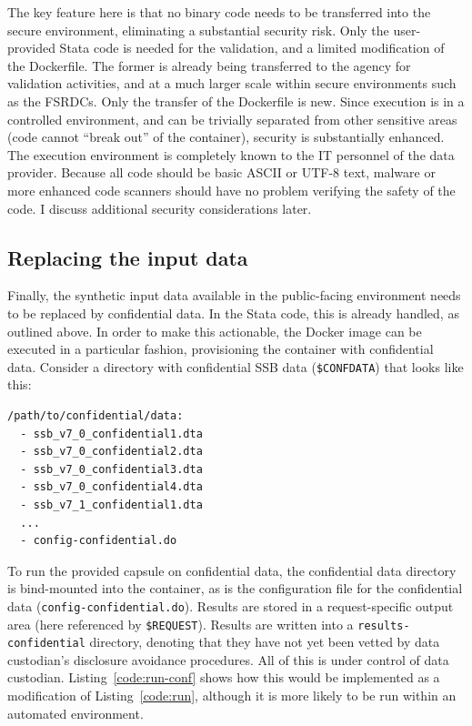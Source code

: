 \documentclass[inline]{hdsr}
\begin{document}
The key feature here is that no binary code needs to be transferred into the secure environment, eliminating a substantial security risk. Only the user-provided Stata code is needed for the validation, and a limited modification of the Dockerfile. The former is already being transferred to the agency for validation activities, and at a much larger scale within secure environments such as the \acp{FSRDC}. Only the transfer of the Dockerfile is new. Since execution is in a controlled environment, and can be trivially separated from other sensitive areas (code cannot ``break out'' of the container), security is substantially enhanced. The execution environment is completely known to the IT personnel of the data provider. Because all code should be basic ASCII or UTF-8 text, malware or more enhanced code scanners should have no problem verifying the safety of the code. I discuss additional security considerations later.

\subsection{Replacing the input data}

Finally, the synthetic input data available in the public-facing environment needs to be replaced by confidential data. In the Stata code, this is already handled, as outlined above. In order to make this actionable, the Docker image can be executed in a particular fashion, provisioning the container with confidential data. Consider a directory with confidential SSB data (\texttt{\$CONFDATA}) that looks like this:

\begin{lstlisting}[language=bash]
/path/to/confidential/data:
  - ssb_v7_0_confidential1.dta
  - ssb_v7_0_confidential2.dta
  - ssb_v7_0_confidential3.dta
  - ssb_v7_0_confidential4.dta
  - ssb_v7_1_confidential1.dta
  ...
  - config-confidential.do   
\end{lstlisting}

To run the provided capsule on confidential data, the confidential data directory is  bind-mounted into the container, as is the configuration file for the confidential data (\texttt{config-confidential.do}). Results are stored in a request-specific output area (here referenced by \texttt{\$REQUEST}). Results are written into a \texttt{results-confidential} directory, denoting that they have not yet been vetted by data custodian's disclosure avoidance procedures. All of this is under control of data custodian. Listing~\ref{code:run-conf} shows how this would be implemented as a  modification of Listing~\ref{code:run}, although it is more likely to be run within an automated environment. 
\end{document}
